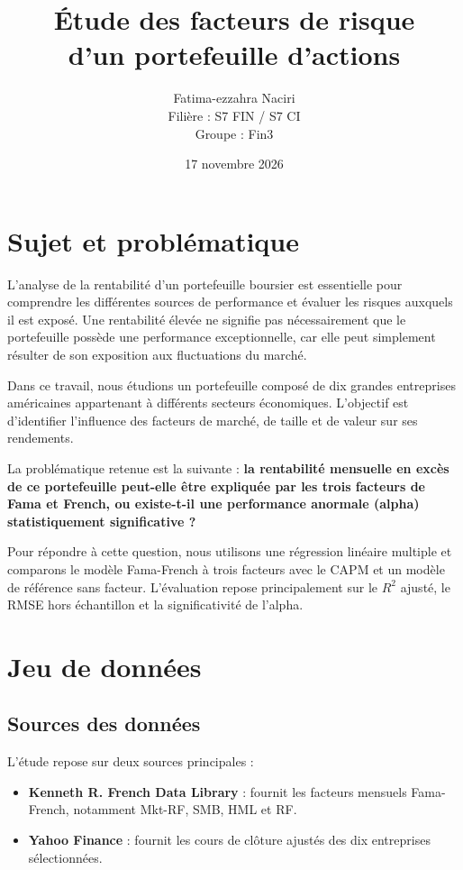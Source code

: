 \documentclass[12pt,a4paper]{article}
\title{\textbf{Étude des facteurs de risque\\d'un portefeuille d'actions}}
\author{Fatima-ezzahra Naciri\\[0.5em]
        Filière : S7 FIN / S7 CI \\
        Groupe : Fin3}
\date{17 novembre 2026}
\begin{document}
\maketitle
\thispagestyle{empty}
\newpage

\tableofcontents
\newpage

\section{Sujet et problématique}

L'analyse de la rentabilité d'un portefeuille boursier est essentielle pour comprendre les différentes sources de performance et évaluer les risques auxquels il est exposé. Une rentabilité élevée ne signifie pas nécessairement que le portefeuille possède une performance exceptionnelle, car elle peut simplement résulter de son exposition aux fluctuations du marché.

Dans ce travail, nous étudions un portefeuille composé de dix grandes entreprises américaines appartenant à différents secteurs économiques. L'objectif est d'identifier l'influence des facteurs de marché, de taille et de valeur sur ses rendements.

La problématique retenue est la suivante : \textbf{la rentabilité mensuelle en excès de ce portefeuille peut-elle être expliquée par les trois facteurs de Fama et French, ou existe-t-il une performance anormale (alpha) statistiquement significative ?}

Pour répondre à cette question, nous utilisons une régression linéaire multiple et comparons le modèle Fama-French à trois facteurs avec le CAPM et un modèle de référence sans facteur. L'évaluation repose principalement sur le $R^2$ ajusté, le RMSE hors échantillon et la significativité de l'alpha.

\section{Jeu de données}

\subsection{Sources des données}

L'étude repose sur deux sources principales :
\begin{itemize}
    \item \textbf{Kenneth R. French Data Library} : fournit les facteurs mensuels Fama-French, notamment Mkt-RF, SMB, HML et RF.
    \item \textbf{Yahoo Finance} : fournit les cours de clôture ajustés des dix entreprises sélectionnées.
\end{itemize}
\end{document}
